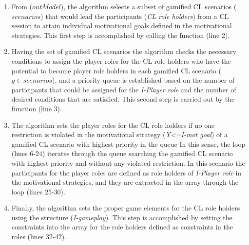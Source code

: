 \begin{enumerate}
\item From  ($ontModel$), the algorithm selects a subset of gamified CL scenarios ($scenarios$) that
would lead the participants (\emph{CL role holders}) from a CL session  to attain individual motivational goals defined in the motivational strategies.
This first step is accomplished by calling the function  (line 2).

\item Having the set of gamified CL scenarios  the algorithm checks the necessary conditions to
assign the player roles for the CL role holders who have the potential to become player role holders in each gamified CL scenario ($g \in scenarios$), and a priority queue  is established based on the number of participants that could be assigned for the \emph{I-Player role} and the number of desired conditions that are satisfied.
This second step is carried out by the function  (line 3).

\item The algorithm sets the player roles for the CL role holders if no one restriction is violated in the motivational strategy (\emph{Y<=I-mot goal}) of a gamified CL scenario  with highest priority in the queue 
In this sense, the loop  (lines 6-24) iterates through the queue  searching the gamified CL scenario  with highest priority and without any violated restriction.
In this scenario  the participants for the player roles are defined as role holders of \emph{I-Player role} in the motivational strategies, and they are extracted in the array  through the loop  (lines 25-30). 

\item Finally, the algorithm sets the proper game elements for the CL role holders using the structure  (\emph{I-gameplay}).
This step is accomplished by setting the constraints  into the array  for the role holders  defined as constraints in the roles  (lines 32-42).
\end{enumerate}

